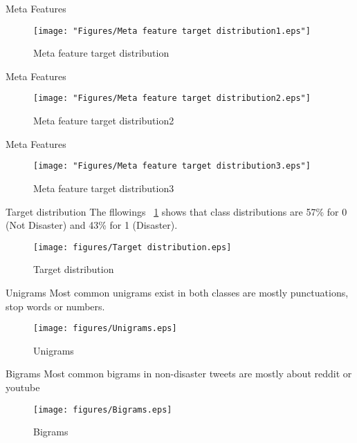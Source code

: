 \documentclass[
 size=12pt,
 paper=smartboard, %
 mode=present, %
 display=slides, %
 style=tuliplab,  %
 pauseslide,
 fleqn,leqno,clock]{powerdot}
\begin{document}
\begin{slide}{Meta Features}
\begin{figure}[tbph]
	\centering
	\texttt{[image: "Figures/Meta feature target distribution1.eps"]}
	\caption{Meta feature target distribution}
\end{figure}
\end{slide}

\begin{slide}{Meta Features}
	\begin{figure}[tbph]
		\centering
		\texttt{[image: "Figures/Meta feature target distribution2.eps"]}
		\caption{Meta feature target distribution2}
	\end{figure}
\end{slide}

\begin{slide}{Meta Features}
	\begin{figure}[tbph]
		\centering
		\texttt{[image: "Figures/Meta feature target distribution3.eps"]}
		\caption{Meta feature target distribution3}
	\end{figure}
\end{slide}

\begin{slide}{Target distribution}
The fllowings ~\cref{fig:Target-distribution} shows that 
class distributions are 57\% for 0 (Not Disaster) and 43\% for 1 (Disaster). 
\\
\begin{figure}[htbp]
	\centering
	\texttt{[image: figures/Target distribution.eps]}
	\caption{Target distribution}
	\label{fig:Target-distribution}
\end{figure}
\end{slide}

\begin{slide}{Unigrams}
Most common unigrams exist in both classes are mostly punctuations, stop words or numbers.
\begin{figure}[htbp]
	\centering
	\texttt{[image: figures/Unigrams.eps]}
	\caption{Unigrams}
	\label{fig:Unigrams}
\end{figure}
\end{slide}

\begin{slide}{Bigrams}
Most common bigrams in non-disaster tweets are mostly about reddit or youtube
\begin{figure}[htbp]
	\centering
	\texttt{[image: figures/Bigrams.eps]}
	\caption{Bigrams}
	\label{fig:Bigrams}
\end{figure}
\end{slide}
\end{document}
